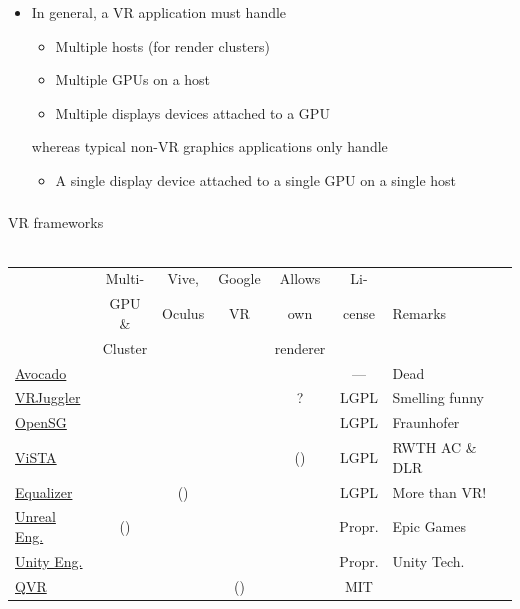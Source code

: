 \documentclass[utf8,stillsansserifmath,fleqn,t]{beamer}
\newcommand{\cmark}{\ding{51}}%
\newcommand{\xmark}{\ding{55}}%
\begin{document}
\begin{frame}
\begin{itemize}
\item In general, a VR application must handle
    \begin{itemize}
    \item Multiple hosts (for render clusters)
    \item Multiple GPUs on a host
    \item Multiple displays devices attached to a GPU
    \end{itemize}
    whereas typical non-VR graphics applications only handle
    \begin{itemize}
    \item A single display device attached to a single GPU on a single host
    \end{itemize}
\end{itemize}
\end{frame}

\begin{frame}
\frametitle{\insertsection}
VR frameworks\\~\\
{\footnotesize
\begin{tabular}{l|c|c|c|c|c|l}
~       & Multi-      & Vive,    & Google  & Allows   & Li-  & ~ \\
~       & GPU \&      & Oculus   & VR      & own      & cense& Remarks \\
~       & Cluster     & ~        & ~       & renderer & ~    & ~\\ \hline
\href{http://doi.org/10.1109/VR.1999.756918}{Avocado} &
           \cmark     & \xmark   & \xmark  & \xmark   & ---  & Dead\\\hline
\href{http://www.vrjuggler.org/}{VRJuggler} &
           \cmark     & \xmark   & \xmark  & ?        & LGPL & Smelling funny\\\hline
\href{http://opensg.org/}{OpenSG} &
           \cmark     & \xmark   & \xmark  & \xmark   & LGPL & Fraunhofer\\\hline
\href{http://www.itc.rwth-aachen.de/cms/IT-Center/Forschung-Projekte/Virtuelle-Realitaet/Infrastruktur/~fgmo/ViSTA-Virtual-Reality-Toolkit/?lidx=1}{ViSTA}&
           \cmark     & \xmark   & \xmark  & (\xmark) & LGPL & RWTH AC \& DLR\\\hline
\href{https://github.com/Eyescale/Equalizer}{Equalizer} &
           \cmark     & (\xmark) & \xmark  & \cmark   & LGPL & More than VR! \\\hline
\href{https://www.unrealengine.com/}{Unreal Eng.} & (\href{http://hci.uni-wuerzburg.de/projects/caveudk/}{\xmark}) 
                      & \cmark   & \cmark  & \xmark   & Propr. & Epic Games\\\hline
\href{https://unity3d.com/}{Unity Eng.} &
           \xmark     & \cmark   & \cmark  & \xmark   & Propr. & Unity Tech.\\\hline
\href{https://marlam.de/qvr}{QVR} &
           \cmark     & \cmark   & (\cmark)  & \cmark   & MIT  & ~\\
\end{tabular}
}
\end{frame}
\end{document}
